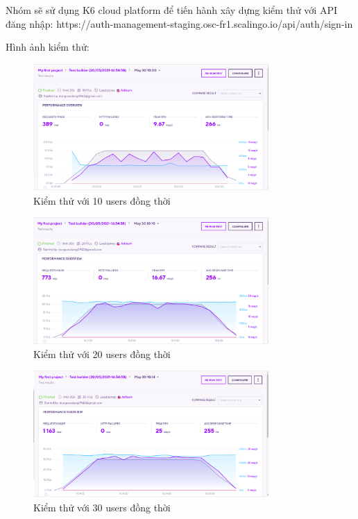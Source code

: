 		    Nhóm sẽ sử dụng K6 cloud platform để tiến hành xây dựng kiểm thử với API đăng nhập:
		    https://auth-management-staging.osc-fr1.scalingo.io/api/auth/sign-in
		    
		Hình ảnh kiểm thử:
        
        \begin{figure}[!ht]
			\includegraphics[width=0.8\textwidth]{Images/testing/testing_10.png}
			\centering
			\linebreak
			\caption{Kiểm thử với 10 users đồng thời}
		\end{figure}
	\newpage
		\begin{figure}[!ht]
			\includegraphics[width=0.8\textwidth]{Images/testing/testing_20.png}
			\centering
			\linebreak
			\caption{Kiểm thử với 20 users đồng thời}
		\end{figure}
		\newpage
		\begin{figure}[!ht]
			\includegraphics[width=0.8\textwidth]{Images/testing/testing_30.png}
			\centering
			\linebreak
			\caption{Kiểm thử với 30 users đồng thời}
		\end{figure}
